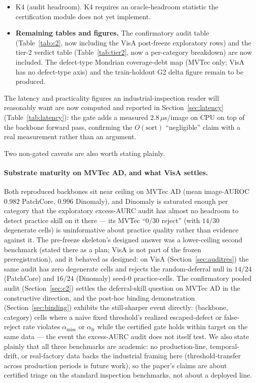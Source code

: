 \documentclass[11pt]{article}
\begin{document}
\begin{itemize}
        freeze is the intended sequencing, not an inconsistency.
  \item K4 (audit headroom). K4 requires an oracle-headroom
        statistic the certification module does not yet implement.
  \item \textbf{Remaining tables and figures.} The confirmatory audit table (Table~\ref{tab:c2}, now
        including the VisA post-freeze exploratory rows) and the tier-2 verdict table
        (Table~\ref{tab:tier2}, now a per-category breakdown) are now included. The defect-type
        Mondrian coverage-debt map (MVTec only; VisA has no defect-type axis) and the train-holdout
        G2 delta figure remain to be produced.
\end{itemize}

The latency and practicality figures an industrial-inspection reader will reasonably want are now
computed and reported in Section~\ref{sec:latency} (Table~\ref{tab:latency}): the gate adds a
measured $2.8\,\mu$s/image on CPU on top of the backbone forward pass, confirming the
$O(\text{sort})$ ``negligible'' claim with a real measurement rather than an argument.

Two non-gated caveats are also worth stating plainly.

\paragraph{Substrate maturity on MVTec AD, and what VisA settles.} Both reproduced backbones sit
near ceiling on MVTec AD (mean image-AUROC $0.982$ PatchCore, $0.996$ Dinomaly), and Dinomaly is
saturated enough per category that the exploratory excess-AURC audit has almost no headroom to
detect practice skill on it there --- its MVTec ``$0/30$ reject'' (with $14/30$ degenerate cells)
is uninformative about practice quality rather than evidence against it. The pre-freeze
skeleton's designed answer was a lower-ceiling second benchmark (stated there as a plan; VisA is
not part of the frozen preregistration), and it behaved as designed: on VisA
(Section~\ref{sec:auditres}) the same audit has zero degenerate cells and rejects the
random-deferral null in $14/24$ (PatchCore) and $16/24$ (Dinomaly) seed-$0$ practice-cells. The
confirmatory pooled audit (Section~\ref{sec:c2}) settles the deferral-skill question on MVTec AD
in the constructive direction, and the post-hoc binding demonstration (Section~\ref{sec:binding})
exhibits the still-sharper event directly: (backbone, category) cells where a naive fixed
threshold's realized escaped-defect or false-reject rate violates $\alpha_{\text{miss}}$ or
$\alpha_{\text{fr}}$ while the certified gate holds within target on the same data --- the event the
excess-AURC audit does not itself test. We
also state plainly that all three benchmarks are academic: no production-line, temporal-drift, or
real-factory data backs the industrial framing here (threshold-transfer across production
periods is future work), so the paper's claims are about certified triage on the standard
inspection benchmarks, not about a deployed line.
\end{document}

